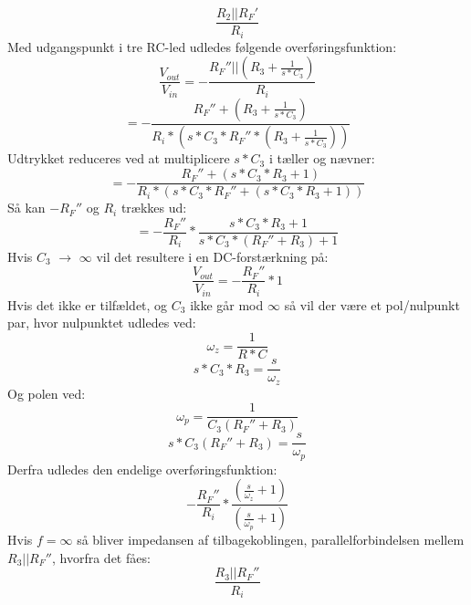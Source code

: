 %
\begin{equation}
        \frac{R_2||R_F'}{R_i}
\end{equation}
% 
Med udgangspunkt i tre RC-led udledes følgende overføringsfunktion:
%
\begin{equation}
        \frac{V_{out}}{V_{in}} = -\frac{R_F''||\left(R_3+\frac{1}{s*C_3}\right)}{R_i}
\end{equation}
%
\begin{equation}
        = - \frac{R_F''+\left(R_3+\frac{1}{s*C_3}\right)}{R_i*\left(s*C_3*R_F''*\left(R_3+\frac{1}{s*C_3}\right)\right)}
\end{equation}
%
Udtrykket reduceres ved at multiplicere $s*C_3$ i tæller og nævner:
%
\begin{equation}
        = - \frac{R_F''+\left(s*C_3*R_3+1\right)}{R_i*\left(s*C_3*R_F''+\left(s*C_3*R_3+1\right)\right)}
\end{equation}
%
Så kan $-R_F''$ og $R_i$ trækkes ud:
%
\begin{equation}
        = -\frac{R_F''}{R_i}*\frac{s*C_3*R_3+1}{s*C_3*\left(R_F''+R_3\right)+1}
\end{equation}
% 
Hvis $C_3$ $\longrightarrow$ $\infty$ vil det resultere i en DC-forstærkning på:
%
\begin{equation}
        \frac{V_{out}}{V_{in}} = -\frac{R_F''}{R_i}*1
\end{equation}
%
Hvis det ikke er tilfældet, og $C_3$ ikke går mod $\infty$ så vil der være et pol/nulpunkt par, hvor nulpunktet udledes ved:
%
\begin{equation}
        \omega_z = \frac{1}{R*C} 
\end{equation}
%
\begin{equation}
         s*C_3*R_3 = \frac{s}{\omega_z}
\end{equation}
%
Og polen ved:
%
\begin{equation}
        \omega_p = \frac{1}{C_3\left(R_F''+R_3\right)}
\end{equation}
%
\begin{equation}
        s*C_3\left(R_F''+R_3\right) = \frac{s}{\omega_p}
\end{equation}
%
Derfra udledes den endelige overføringsfunktion:
%
\begin{equation}
        -\frac{R_F''}{R_i}*\frac{\left(\frac{s}{\omega_z}+1\right)}{\left(\frac{s}{\omega_p}+1\right)}
\end{equation}
%
Hvis $f = \infty$ så bliver impedansen af tilbagekoblingen, parallelforbindelsen mellem $R_3||R_F''$, hvorfra det fåes:
%
\begin{equation}
        \frac{R_3||R_F''}{R_i}
\end{equation}
% 

